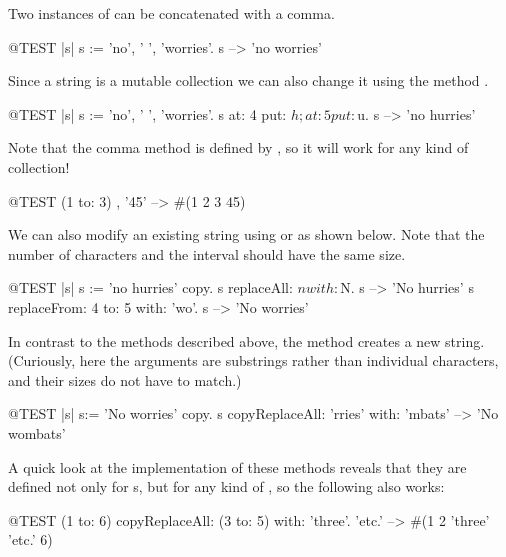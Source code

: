 \documentclass[a4paper,10pt,twoside]{book}
\begin{document}
Two instances of  can be concatenated with a comma.
\begin{code}{@TEST |s|}
s := 'no', ' ', 'worries'.
s -->  'no worries'
\end{code}

Since a string is a mutable collection we can also change it using the method .

\begin{code}{@TEST |s| s := 'no', ' ', 'worries'.}
s at: 4 put: $h; at: 5 put: $u.
s --> 'no hurries'
\end{code}

Note that the comma method is defined by , so it will work for any kind of collection!
\begin{code}{@TEST}
(1 to: 3) , '45' --> #(1 2 3 $4 $5)
\end{code}

We can also modify an existing string using  or  as shown below. Note that the number of characters and the interval should have the same size.

\begin{code}{@TEST |s| s := 'no hurries' copy.}
s replaceAll: $n with: $N.
s --> 'No hurries'
s replaceFrom: 4 to: 5 with: 'wo'.
s --> 'No worries'
\end{code}

In contrast to the methods described above, the method  creates a new string.
(Curiously, here the arguments are substrings rather than individual characters, and their sizes do not have to match.)

\begin{code}{@TEST |s| s:= 'No worries' copy.}
s copyReplaceAll: 'rries' with: 'mbats' --> 'No wombats'
\end{code}

A quick look at the implementation of these methods reveals that they are defined not only for s, but for any kind of , so the following also works:

\begin{code}{@TEST}
(1 to: 6) copyReplaceAll: (3 to: 5) with: { 'three'. 'etc.' } --> #(1 2 'three' 'etc.' 6)
\end{code}
\end{document}
